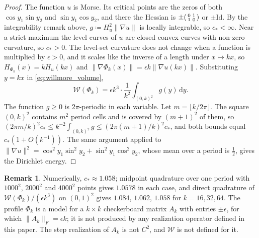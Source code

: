 \documentclass[11pt,a4paper,reqno]{amsart}
\theoremstyle{definition}
\newtheorem{remark}[theorem]{Remark}
\numberwithin{equation}{section}
\newcommand{\Id}{\mathrm{Id}}
\newcommand{\dif}{\,\mathrm{d}}
\begin{document}
\begin{proof}
The function $u$ is Morse. Its critical points are the zeros of both $\cos y_1 \sin y_2$ and $\sin y_1 \cos y_2$, and there the Hessian is $\pm\begin{psmallmatrix} 0 & 1 \\ 1 & 0 \end{psmallmatrix}$ or $\pm\Id$. By the integrability remark above, $g \coloneqq H_u^2\|\nabla u\|$ is locally integrable, so $c_* < \infty$. Near a strict maximum the level curves of $u$ are closed convex curves with non-zero curvature, so $c_* > 0$. The level-set curvature does not change when a function is multiplied by $\epsilon > 0$, and it scales like the inverse of a length under $x \mapsto kx$, so $H_{\Phi_k}(x) = k H_u(kx)$ and $\|\nabla\Phi_k(x)\| = \epsilon k \|\nabla u(kx)\|$. Substituting $y = kx$ in \eqref{eq:willmore_volume},
\begin{equation}
    \mathcal{W}(\Phi_k) = \epsilon k^3 \cdot \frac{1}{k^2} \int_{(0,k)^2} g(y) \dif y.
\end{equation}
The function $g \ge 0$ is $2\pi$-periodic in each variable. Let $m = \lfloor k / 2\pi \rfloor$. The square $(0,k)^2$ contains $m^2$ period cells and is covered by $(m+1)^2$ of them, so $(2\pi m/k)^2 c_* \le k^{-2}\int_{(0,k)^2} g \le (2\pi(m+1)/k)^2 c_*$, and both bounds equal $c_*(1 + O(k^{-1}))$. The same argument applied to $\|\nabla u\|^2 = \cos^2 y_1 \sin^2 y_2 + \sin^2 y_1 \cos^2 y_2$, whose mean over a period is $\frac12$, gives the Dirichlet energy.
\end{proof}

\begin{remark}
Numerically, $c_* \approx 1.058$; midpoint quadrature over one period with $1000^2$, $2000^2$ and $4000^2$ points gives $1.0578$ in each case, and direct quadrature of $\mathcal{W}(\Phi_k)/(\epsilon k^3)$ on $(0,1)^2$ gives $1.084$, $1.062$, $1.058$ for $k = 16, 32, 64$. The profile $\Phi_k$ is a model for a $k \times k$ checkerboard matrix $A_k$ with entries $\pm\epsilon$, for which $\|A_k\|_F = \epsilon k$; it is not produced by any realization operator defined in this paper. The step realization of $A_k$ is not $C^2$, and $\mathcal{W}$ is not defined for it.
\end{remark}
\end{document}
